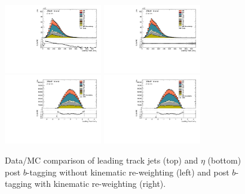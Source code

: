 \begin{figure}[htbp]
  \centering
 \includegraphics[width=0.38\textwidth]{figures/gbb/LeadTrkJet_pT_PreReweight.pdf}
 \includegraphics[width=0.38\textwidth]{figures/gbb/LeadTrkJet_pT_Reweight.pdf}
 \includegraphics[width=0.38\textwidth]{figures/gbb/LeadTrkJet_eta_PreReweight.pdf}
 \includegraphics[width=0.38\textwidth]{figures/gbb/LeadTrkJet_eta_Reweight.pdf}
\caption{Data/MC comparison of leading track jets \pt (top) and $\eta$ (bottom) post $b$-tagging without kinematic re-weighting (left) and post $b$-tagging with kinematic re-weighting (right).} %
  \label{fig:gbb-pT_leadtrkjets}
\end{figure}


